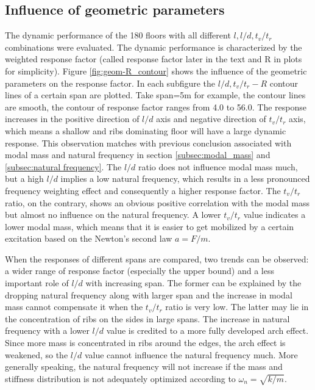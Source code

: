 \subsection{Influence of geometric parameters}
The dynamic performance of the 180 floors with all different $l,l/d,t_v/t_r$ combinations were evaluated. The dynamic performance is characterized by the weighted response factor (called response factor later in the text and R in plots for simplicity). 
Figure \ref{fig:geom-R_contour} shows the influence of the geometric parameters on the response factor. In each subfigure the $l/d,t_v/t_r-R$ contour lines of a certain span are plotted. Take span=5m for example, the contour lines are smooth, the contour of response factor ranges from 4.0 to 56.0. The response increases in the positive direction of $l/d$ axis and negative direction of $t_v/t_r$ axis, which means a shallow and ribs dominating floor will have a large dynamic response. This observation matches with previous conclusion associated with modal mass and natural frequency in section \ref{subsec:modal_mass} and \ref{subsec:natural frequency}. The $l/d$ ratio does not influence modal mass much, but a high $l/d$ implies a low natural frequency, which results in a less pronounced frequency weighting effect and consequently a higher response factor. The $t_v/t_r$ ratio, on the contrary, shows an obvious positive correlation with the modal mass but almost no influence on the natural frequency. A lower $t_v/t_r$ value indicates a lower modal mass, which means that it is easier to get mobilized by a certain excitation based on the Newton's second law $a=F/m$. 

When the responses of different spans are compared, two trends can be observed: a wider range of response factor (especially the upper bound) and a less important role of $l/d$ with increasing span. The former can be explained by the dropping natural frequency along with larger span and the increase in modal mass cannot compensate it when the $t_v/t_r$ ratio is very low. The latter may lie in the concentration of ribs on the sides in large spans. The increase in natural frequency with a lower $l/d$ value is credited to a more fully developed arch effect. Since more mass is concentrated in ribs around the edges, the arch effect is weakened, so the $l/d$ value cannot influence the natural frequency much. More generally speaking, the natural frequency will not increase if the mass and stiffness distribution is not adequately optimized according to $\omega_n=\sqrt{k/m}$.

